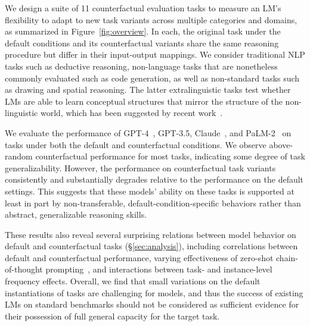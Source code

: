 We design a suite of 11 counterfactual evaluation tasks to measure an LM's flexibility to adapt to new task variants across multiple categories and domains, as summarized in Figure~\ref{fig:overview}.
In each, the original task under the default conditions and its counterfactual variants share the same reasoning procedure but differ in their input-output mappings.
We consider  traditional NLP tasks such as deductive reasoning, non-language tasks that are nonetheless commonly evaluated such as code generation, as well as non-standard tasks such as drawing and spatial reasoning. The latter extralinguistic tasks test whether LMs are able to learn conceptual structures that  mirror the structure of the non-linguistic world, which has been suggested by recent work~. 

We  evaluate the performance of GPT-4~\citep{gpt4}, GPT-3.5, Claude~\citep{claude}, and PaLM-2~\citep{palm2} on
tasks under both
the default and counterfactual conditions. We observe above-random counterfactual performance for most tasks, indicating some degree of task generalizability. However, the performance on counterfactual task variants consistently and substantially degrades relative to the performance on the default settings.
This suggests that these models' ability on these tasks is supported at least in part by non-transferable, default-condition-specific behaviors rather than abstract, generalizable reasoning skills.

These results also reveal several surprising relations between model behavior on default and counterfactual tasks (\S\ref{sec:analysis}), including correlations between default and counterfactual performance, varying effectiveness of zero-shot chain-of-thought prompting~\cite{kojima2023large}, and interactions between task- and instance-level frequency effects.
Overall, we find that small variations on the default instantiations of tasks are challenging for models, and thus the success of existing LMs on standard benchmarks should not be considered as sufficient evidence for their possession of full general capacity for the target task.








